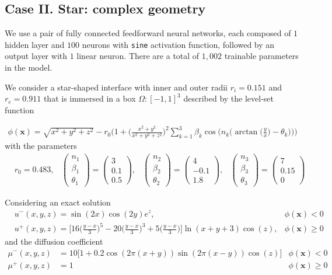 \documentclass{elsarticle}
\begin{document}
\subsection{Case II. Star: complex geometry} \label{subsec:star}

We use a pair of fully connected feedforward neural networks, each composed of $1$ hidden layer and $100$ neurons with \texttt{sine} activation function, followed  by an output layer with $1$ linear neuron. There are a total of $1,002$ trainable parameters in the model.

We consider a star-shaped interface with inner and outer radii $r_i=0.151$ and $r_e=0.911$ that is immersed in a box $\Omega:[-1,1]^3$ described by the level-set function

\begin{align*}
\phi(\mathbf{x}) = \sqrt{x^2 + y^2 + z^2} - r_0 \bigg( 1 + \big( \frac{x^2 + y^2}{x^2 + y^2 + z^2}\big)^2  \sum_{k=1}^3 \beta_k \cos\big(n_k \big(\arctan\big(\frac{y}{x}\big) - \theta_k\big) \big) \bigg)
\end{align*}
with the parameters
\begin{align*}
&r_0 = 0.483, &\begin{pmatrix}
n_1\\
\beta_1\\
\theta_1
\end{pmatrix}=\begin{pmatrix}
3\\
0.1\\
0.5
\end{pmatrix}, &\begin{pmatrix}
n_2\\
\beta_2\\
\theta_2
\end{pmatrix}=\begin{pmatrix}
4\\
-0.1\\
1.8
\end{pmatrix}, &\begin{pmatrix}
n_3\\
\beta_3\\
\theta_3
\end{pmatrix}=\begin{pmatrix}
7\\
0.15\\
0
\end{pmatrix}
\end{align*}

Considering an exact solution 
\begin{align*}
& u^-(x,y,z)=\sin(2x)\cos(2y) e^{z}, & \phi(\mathbf{x})<0\\
& u^+(x,y,z)=\bigg[ 16\big(\frac{y-x}{3}\big)^5 - 20 \big(\frac{y-x}{3}\big)^3 + 5\big( \frac{y-x}{3}\big) \bigg]\ln(x+y+3)\cos(z)          , & \phi(\mathbf{x})\ge 0
\end{align*}
and the diffusion coefficient
\begin{align*}
\mu^-(x,y,z)&=10\bigg[ 1+0.2\cos(2\pi(x+y))\sin(2\pi(x-y)) \cos(z) \bigg] &\phi(\mathbf{x})<0 \\
\mu^+(x,y,z)&=1 &\phi(\mathbf{x})\ge 0 
\end{align*}
\end{document}
